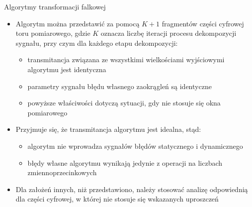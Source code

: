 \documentclass[12pt, polish, aspectratio = 169]{beamer}
\begin{document}
\begin{frame}{Algorytmy transformacji falkowej}
\begin{itemize}
\item Algorytm można przedstawić za pomocą $K+1$ fragmentów części cyfrowej toru pomiarowego, gdzie $K$ oznacza liczbę iteracji procesu dekompozycji sygnału, przy czym dla każdego etapu dekompozycji:
	\begin{itemize}
	\item transmitancja związana ze wszystkimi wielkościami wyjściowymi algorytmu jest identyczna
	\item parametry sygnału błędu własnego zaokrągleń są identyczne
	\item powyższe właściwości dotyczą sytuacji, gdy nie stosuje się okna pomiarowego
	\end{itemize}
\item Przyjmuje się, że transmitancja algorytmu jest idealna, stąd:
	\begin{itemize}
	\item algorytm nie wprowadza sygnałów błędów statycznego i dynamicznego
	\item błędy własne algorytmu wynikają jedynie z operacji na liczbach zmiennoprzecinkowych
	\end{itemize}
\item Dla założeń innych, niż przedstawiono, należy stosować analizę odpowiednią dla części cyfrowej, w której nie stosuje się wskazanych uproszczeń
\end{itemize}
\end{frame}

\end{document}
